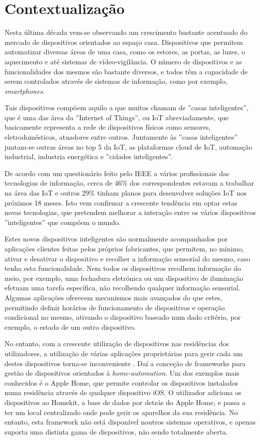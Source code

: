 \chapter{Contextualização}

Nesta última década vem-se observando um crescimento bastante acentuado do mercado de dispositivos orientados ao espaço casa. Dispositivos que permitem automatizar diversas áreas de uma casa, como os estores, as portas, as luzes, o aquecimento e até sistemas de vídeo-vigilância. O número de dispositivos e as funcionalidades dos mesmos são bastante diversos, e todos têm a capacidade de serem controlados através de sistemas de informação, como por exemplo, \textit{smartphones}.

Tais dispositivos compõem aquilo a que muitos chamam de ''casas inteligentes'', que é uma das área da ''Internet of Things'', ou IoT abreviadamente, que basicamente representa a rede de dispositivos físicos como sensores, eletrodomésticos, atuadores entre outros. Juntamente às ''casas inteligentes'' juntam-se outras áreas no top 5 da IoT, as plataformas cloud de IoT, automação industrial, industria energética e ''cidades inteligentes''.

De acordo com um questionário feito pelo IEEE \cite{ieeesurvey} a vários profissionais das tecnologias de informação, cerca de 46\% dos correspondentes estavam a trabalhar na área das IoT e outros 29\% tinham planos para desenvolver soluções IoT nos próximos 18 meses. Isto vem confirmar a crescente tendência em optar estas novas tecnologias, que pretendem melhorar a interação entre os vários dispositivos ''inteligentes'' que compõem o mundo.

Estes novos dispositivos inteligentes são normalmente acompanhados por aplicações clientes feitas pelos próprios fabricantes, que permitem, no mínimo, ativar e desativar o dispositivo e recolher a informação sensorial do mesmo, caso tenha esta funcionalidade. Nem todos os dispositivos recolhem informação do meio, por exemplo, uma fechadura eletrónica ou um dispositivo de iluminação efetuam uma tarefa específica, não recolhendo qualquer informação sensorial. Algumas aplicações oferecem mecanismos mais avançados do que estes, permitindo definir horários de funcionamento de dispositivos e operação condicional no mesmo, ativando o dispositivo baseado num dado critério, por exemplo, o estado de um outro dispositivo.

No entanto, com a crescente utilização de dispositivos nas residências dos utilizadores, a utilização de várias aplicações proprietárias para gerir cada um destes dispositivos torna-se inconveniente \cite{iot-survey-issues}. Daí a conceção de frameworks para gestão de dispositivos orientados à \textit{home-automation}. Um dos exemplos mais conhecidos é o Apple Home, que permite controlar os dispositivos instalados numa residência através de qualquer dispositivo iOS. O utilizador adiciona os dispositivos ao Homekit, a base de dados por detrás do Apple Home, e passa a ter um local centralizado onde pode gerir os aparelhos da sua residência. No entanto, esta framework não está disponível noutros sistemas operativos, e apenas suporta uma distinta gama de dispositivos, não sendo totalmente aberta.

